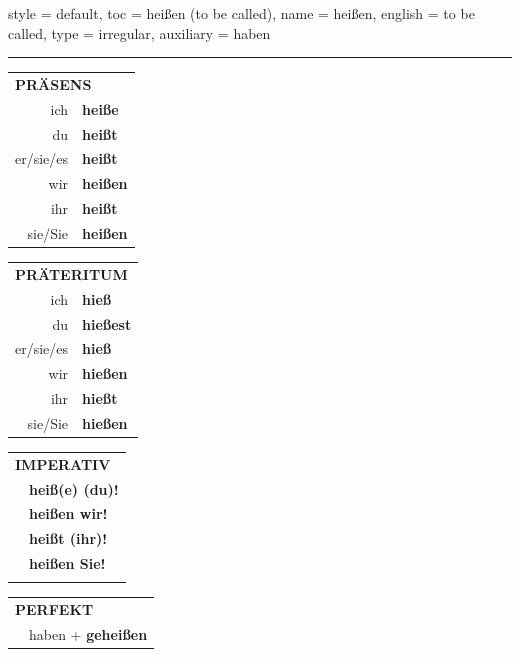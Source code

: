 \begin{verbentry}{
  style = {default},
  toc = {heißen (to be called)},
  name = {heißen},
  english = {to be called},
  type = {irregular},
  auxiliary = {haben}
}
 
    
     \vspace{5pt}

    \hrule
    
    \vspace{5pt}

  \begin{tabular}{rl}
     \multicolumn{2}{l}{\textbf{PRÄSENS} }\\
    ich & \textbf{heiße}\\
    du & \textbf{heißt}\\
    er/sie/es & \textbf{heißt}\\
    wir & \textbf{heißen}\\
    ihr & \textbf{heißt}\\
    sie/Sie & \textbf{heißen}\\
  \end{tabular}
  \hfill
     \begin{tabular}{rl}
    \multicolumn{2}{l}{\textbf{PRÄTERITUM} }\\
    ich & \textbf{hieß}\\
    du & \textbf{hießest}\\
    er/sie/es & \textbf{hieß}\\
    wir & \textbf{hießen}\\
    ihr & \textbf{hießt}\\
    sie/Sie & \textbf{hießen}\\
  \end{tabular}
  \hfill
  \begin{tabular}{rl}
     \multicolumn{2}{l}{\textbf{IMPERATIV} }\\
   & \textbf{heiß(e) (du)!}\\
   & \textbf{heißen wir!}\\
   & \textbf{heißt (ihr)!}\\
   & \textbf{heißen Sie!}\\
   & \vspace{10pt}
  \end{tabular}

    \vspace{10pt}

 \begin{tabular}{rl}
     \multicolumn{2}{l}{\textbf{PERFEKT}}\\
   & haben + \textbf{geheißen}\\
  \end{tabular}
\hfill
   \begin{tabular}{rl}
   

\end{tabular}
\end{verbentry}
